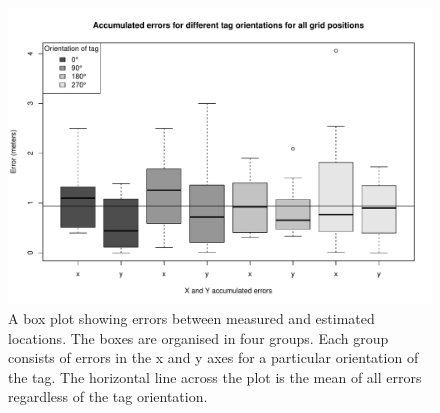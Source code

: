 \documentclass[a4paper,12pt]{article}
\begin{document}
\begin{figure}
	\begin{center}
		\includegraphics[width=1\textwidth]{error_boxplot}
		\caption{A box plot showing errors between measured and estimated locations. The boxes are organised in four groups. Each group consists of errors in the x and y axes for a particular orientation of the tag. The horizontal line across the plot is the mean of all errors regardless of the tag orientation.}
	\end{center}
\end{figure}

\newpage


\end{document}
